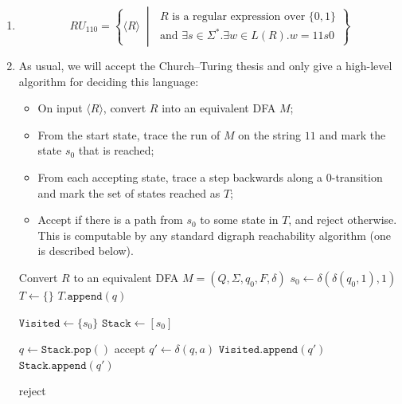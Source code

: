 \documentclass{article}
\theoremstyle{definition}
\theoremstyle{definition}
\theoremstyle{remark}
\begin{document}
\begin{enumerate}
    \item[$(i)$]
    \begin{equation*}
        RU_{110}=\left\{\langle R\rangle\;\middle|\;\begin{gathered}
            R\text{ is a regular expression over }\{0,1\}\\
            \text{and }\exists s\in\Sigma^\ast.\exists w\in L(R).w=11s0
        \end{gathered}
        \right\}
    \end{equation*}
    
    \item[$(ii)$] As usual, we will accept the Church--Turing thesis and only give a high-level algorithm for deciding this language:
    \begin{itemize}
        \item On input $\langle R\rangle$, convert $R$ into an equivalent DFA $M$;
        \item From the start state, trace the run of $M$ on the string $11$ and mark the state $s_0$ that is reached;
        \item From each accepting state, trace a step backwards along a $0$-transition and mark the set of states reached as $T$;
        \item Accept if there is a path from $s_0$ to some state in $T$, and reject otherwise. This is computable by any standard digraph reachability algorithm (one is described below).
    \end{itemize}

    \begin{algorithm}[H]
    \caption{Decide $RU_{110}$}
    \begin{algorithmic}[1]
        \State Convert $R$ to an equivalent DFA $M=(Q,\Sigma,q_0,F,\delta)$
        \State $s_0\gets\delta(\delta(q_0,1),1)$
        \State$T\gets\{\}$
                \State $T.\texttt{append}(q)$
            \EndIf
        \EndFor

    \State $\texttt{Visited}\gets \{s_0\}$
    \State $\texttt{Stack}\gets[s_0]$

        \State $q\gets\texttt{Stack}.\texttt{pop}()$
            \State \Return accept
        \EndIf
            \State $q'\gets\delta(q,a)$
                \State $\texttt{Visited}.\texttt{append}(q')$
                \State $\texttt{Stack}.\texttt{append}(q')$
            \EndIf
        \EndFor
    \EndWhile

    \State \Return reject

    \EndProcedure
    \end{algorithmic}
    \end{algorithm}
\end{enumerate}
\end{document}
